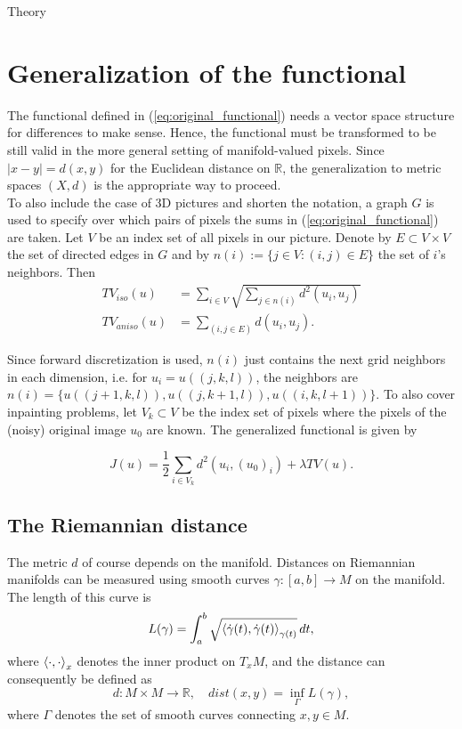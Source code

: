 \begin{chapter}{Theory}
\label{ch:theory}

\section{Generalization of the functional} %
\label{sec:Generalization of the functional}
The functional defined in (\ref{eq:original_functional}) needs a vector space structure for differences to make sense. Hence, the functional
must be transformed to be still valid in the more general setting of manifold-valued pixels. Since $|x-y|=d(x,y)$ for the 
Euclidean distance on $\mathbb{R}$, the generalization to metric spaces $(X,d)$ is the appropriate way to proceed.\\

To also include the case of 3D pictures and shorten the notation, a graph $G$ is used to specify over which pairs of pixels the sums in (\ref{eq:original_functional})
are taken. Let $V$ be an index set of all pixels in our picture. Denote by $E\subset V\times V$ the set of directed edges in $G$ and by 
$n(i):=\lbrace j\in V: (i,j)\in E\rbrace$ the set of $i$'s neighbors. Then
\begin{align}
    TV_{iso}(u) &= \sum_{i\in V}\sqrt{\sum_{j\in n(i)}d^{2}(u_i,u_j)}\\
    TV_{aniso}(u) &= \sum_{(i,j\in E)}d(u_i,u_j).
\end{align}

Since forward discretization is used, $n(i)$ just contains the next grid neighbors in each dimension, i.e. for $u_i=u((j,k,l))$, the neighbors are 
$n(i)=\lbrace u((j+1,k,l)), u((j,k+1,l)), u((i,k,l+1)) \rbrace$. To also cover inpainting problems, let $V_k\subset V$ be the index set of pixels
where the pixels of the (noisy) original image $u_0$ are known. The generalized functional is given by

\begin{equation}
    \label{eq:general_functional}
    J(u)=\frac{1}{2}\sum_{i\in V_k}d^2(u_i,(u_0)_i) +\lambda TV(u).
\end{equation}


\subsection{The Riemannian distance} %
\label{sub:RiemannianDistance}
The metric $d$ of course depends on the manifold. Distances on Riemannian manifolds can be measured using smooth curves
$\gamma: [a,b]\to M$ on the manifold. The length of this curve is
\begin{equation}
    L(\gamma) =\int_{a}^b\sqrt{\left\langle \dot{\gamma}(t),\dot{\gamma}(t) \right\rangle_{\gamma(t)}}\mathop{dt},
\end{equation}
where $\left\langle \cdot,\cdot \right\rangle_x$ denotes the inner product on $T_xM$, and the distance can consequently be defined as
\begin{equation}
    d: M\times M\to \mathbb{R},\quad dist(x,y)=\operatorname{inf}_{\Gamma}L(\gamma),
\end{equation}
where $\Gamma$ denotes the set of smooth curves connecting $x,y\in M$. \\


\end{chapter}
